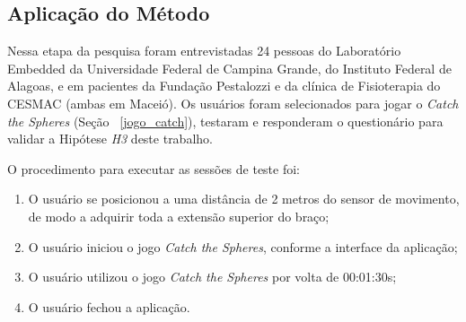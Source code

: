 \subsection{Aplicação do Método}
%


Nessa etapa da pesquisa foram entrevistadas 24 pessoas do Laboratório Embedded da Universidade Federal de Campina Grande, do Instituto Federal de Alagoas, e em pacientes da Fundação Pestalozzi e da clínica de Fisioterapia do CESMAC (ambas em Maceió). Os usuários foram selecionados para jogar o \emph{Catch the Spheres} (Seção ~\ref{jogo_catch}), testaram e responderam o questionário para validar a Hipótese \textit{H3} deste trabalho. 

O procedimento para executar as sessões de teste foi:
\begin{enumerate}
	\item O usuário se posicionou a uma distância de 2 metros do sensor de movimento, de modo a adquirir toda a extensão superior do braço; 	
	\item O usuário iniciou o jogo \textit{Catch the Spheres}, conforme a interface da aplicação;
	\item O usuário utilizou o jogo \textit{Catch the Spheres} por volta de 00:01:30s;
	\item O usuário fechou a aplicação.
\end{enumerate}

